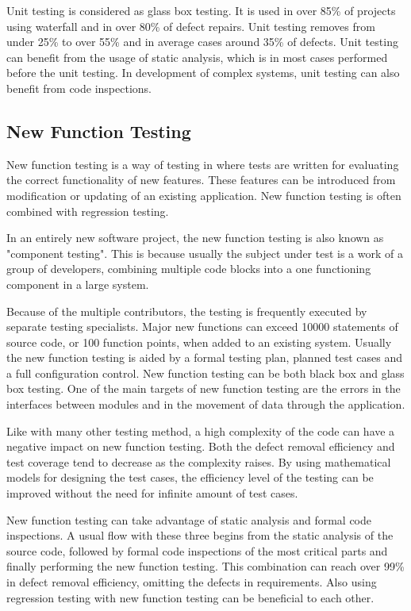  Unit testing is considered as glass box testing. It is used in over 85\% of projects using waterfall and in over 80\% of defect repairs. Unit testing removes from under 25\% to over 55\% and in average cases around 35\% of defects. Unit testing can benefit from the usage of static analysis, which is in most cases performed before the unit testing. In development of complex systems, unit testing can also benefit from code inspections.


 \subsection{New Function Testing}

New function testing is a way of testing in where tests are written for evaluating the correct functionality of new features. These features can be introduced from modification or updating of an existing application. New function testing is often combined with regression testing.

In an entirely new software project, the new function testing is also known as "component testing". This is because usually the subject under test is a work of a group of developers, combining multiple code blocks into a one functioning component in a large system.

Because of the multiple contributors, the testing is frequently executed by separate testing specialists. Major new functions can exceed 10000 statements of source code, or 100 function points, when added to an existing system. Usually the new function testing is aided by a formal testing plan, planned test cases and a full configuration control. New function testing can be both black box and glass box testing. One of the main targets of new function testing are the errors in the interfaces between modules and in the movement of data through the application.

Like with many other testing method, a high complexity of the code can have a negative impact on new function testing. Both the defect removal efficiency and test coverage tend to decrease as the complexity raises. By using mathematical models for designing the test cases, the efficiency level of the testing can be improved without the need for infinite amount of test cases.

New function testing can take advantage of static analysis and formal code inspections. A usual flow with these three begins from the static analysis of the source code, followed by formal code inspections of the most critical parts and finally performing the new function testing. This combination can reach over 99\% in defect removal efficiency, omitting the defects in requirements. Also using regression testing with new function testing can be beneficial to each other.

